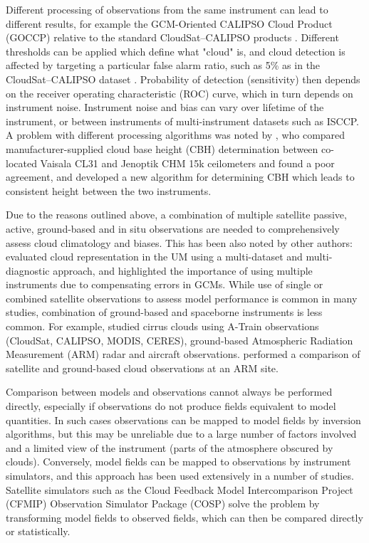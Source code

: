 Different processing of observations from the same instrument can lead
to different results, for example the
GCM-Oriented CALIPSO Cloud Product (GOCCP) relative to the standard
CloudSat--CALIPSO products \citep{chepfer2010}.
Different thresholds can be applied which define what "cloud" is,
and cloud detection is affected by targeting a particular false alarm ratio,
such as 5\% as in the CloudSat--CALIPSO dataset \citep{hagihara2010}.
Probability of detection (sensitivity) then depends on the receiver operating
characteristic (ROC) curve, which in turn depends on instrument
noise. Instrument noise and bias can vary over lifetime of the instrument,
or between instruments of multi-instrument datasets such as ISCCP.
A problem with different processing
algorithms was noted by \cite{martucci2010}, who compared
manufacturer-supplied cloud base height (CBH)
determination between co-located Vaisala CL31 and Jenoptik CHM 15k ceilometers
and found a poor agreement, and developed a new algorithm for determining
CBH which leads to consistent height between the two instruments.

Due to the reasons outlined above, a combination of multiple satellite passive, active,
ground-based and in situ observations are needed to comprehensively assess
cloud climatology and biases. This has been also noted by other authors:
\cite{williams2017} evaluated cloud representation in the UM using a multi-dataset and multi-diagnostic approach, and
highlighted the
importance of using multiple instruments due to compensating errors in GCMs.
While use of single or combined satellite observations to assess model
performance is common in many studies,
combination of ground-based and spaceborne instruments is less common.
For example, \cite{muhlbauer2015} studied cirrus clouds using A-Train
observations (CloudSat, CALIPSO, MODIS, CERES), ground-based
Atmospheric Radiation Measurement (ARM) radar and aircraft observations.
\cite{zhang2017} performed a comparison of satellite and ground-based cloud
observations at an ARM site.

Comparison between models and observations cannot always be performed directly,
especially if observations do not produce fields equivalent to model quantities.
In such cases observations can be mapped to model fields by inversion algorithms,
but this may be unreliable
due to a large number of factors involved and a limited view of the instrument
(parts of the atmosphere obscured by clouds).
Conversely, model fields can be mapped to observations by instrument simulators,
and this approach has been used extensively in a number of studies.
Satellite simulators such as the Cloud Feedback Model Intercomparison Project (CFMIP) Observation Simulator Package (COSP)
\citep{bodas-salcedo2011} solve the problem
by transforming model fields to observed fields, which can then
be compared directly or statistically.

